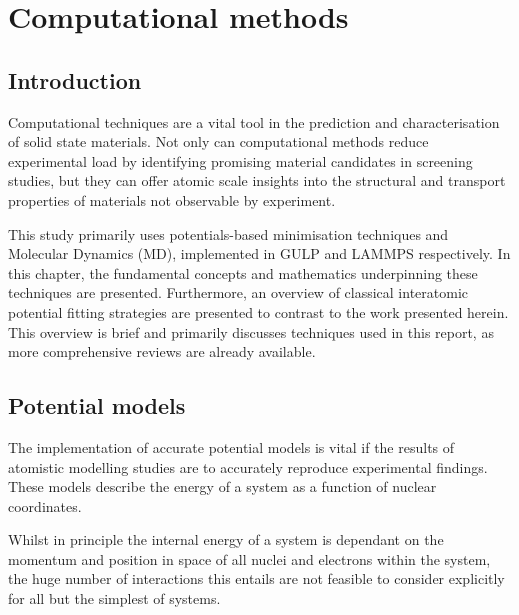 \chapter{Computational methods}
\section{Introduction} %
Computational techniques are a vital tool in the prediction and characterisation of solid state materials.
Not only can computational methods reduce experimental load by identifying promising material candidates in screening studies, but they can offer atomic scale insights into the structural and transport properties of materials not observable by experiment.

This study primarily uses potentials-based minimisation techniques and Molecular Dynamics (MD), implemented in GULP \cite{Gale2003} and LAMMPS \cite{StevePlimton1995} respectively.
In this chapter, the fundamental concepts and mathematics underpinning these techniques are presented.
Furthermore, an overview of classical interatomic potential fitting strategies are presented to contrast to the work presented herein. %
This overview is brief and primarily discusses techniques used in this report, as more comprehensive reviews are already available. \cite{Gale2003, Jensen2007, Catlow2013}

\section{Potential models}
The implementation of accurate potential models is vital if the results of atomistic modelling studies are to accurately reproduce experimental findings.
These models describe the energy of a system as a function of nuclear coordinates.

Whilst in principle the internal energy of a system is dependant on the momentum and position in space of all nuclei and electrons within the system, the huge number of interactions this entails are not feasible to consider explicitly for all but the simplest of systems.

